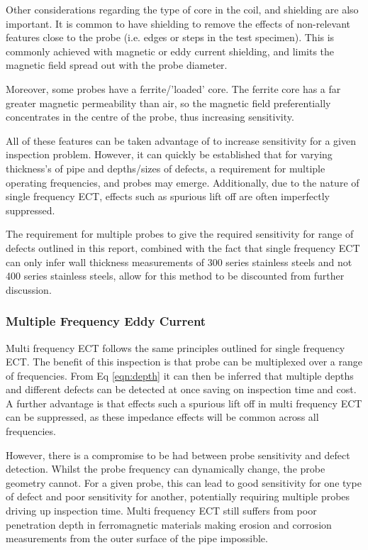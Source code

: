 \documentclass[a4paper,twoside,11pt]{article}
\begin{document}
Other considerations regarding the type of core in the coil, and shielding are also important. 
It is common to have shielding to remove the effects of non-relevant features close to the probe (i.e. edges or steps in the test specimen). 
This is commonly achieved with magnetic or eddy current shielding, and limits the magnetic field spread out with the probe diameter. 

Moreover, some probes have a ferrite/'loaded' core. 
The ferrite core has a far greater magnetic permeability than air, so the magnetic field preferentially concentrates in the centre of the probe, thus increasing sensitivity.

All of these features can be taken advantage of to increase sensitivity for a given inspection problem. 
However, it can quickly be established that for varying thickness's of pipe and depths/sizes of defects, a requirement for multiple operating frequencies, and probes may emerge. Additionally, due to the nature of single frequency ECT, effects such as spurious lift off are often imperfectly suppressed.

The requirement for multiple probes to give the required sensitivity for range of defects outlined in this report, combined with the fact that single frequency ECT can only infer wall thickness measurements of 300 series stainless steels and not 400 series stainless steels, allow for this method to be discounted from further discussion.

\subsubsection{Multiple Frequency Eddy Current}

Multi frequency ECT follows the same principles outlined for single frequency ECT. 
The benefit of this inspection is that probe can be multiplexed over a range of frequencies. 
From Eq \ref{eqn:depth} it can then be inferred that multiple depths and different defects can be detected at once saving on inspection time and cost. 
A further advantage is that effects such a spurious lift off in multi frequency ECT can be suppressed, as these impedance effects will be common across all frequencies.  

However, there is a compromise to be had between probe sensitivity and defect detection.
Whilst the probe frequency can dynamically change, the probe geometry cannot.
For a given probe, this can lead to good sensitivity for one type of defect and poor sensitivity for another, potentially requiring multiple probes driving up inspection time.
Multi frequency ECT still suffers from poor penetration depth in ferromagnetic materials making erosion and corrosion measurements from the outer surface of the pipe impossible.
\end{document}
